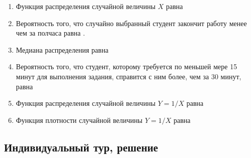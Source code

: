 \begin{enumerate}
\begin{enumerate}
\item Функция распределения случайной величины $X$ равна \underline{\hspace{2cm}}
\item Вероятность того, что случайно выбранный студент закончит работу менее чем за полчаса равна \underline{\hspace{2cm}}.
\item Медиана распределения равна \underline{\hspace{2cm}}
\item Вероятность того, что студент, которому требуется по меньшей мере 15 минут для выполнения задания, справится с ним более, чем за 30 минут, равна \underline{\hspace{2cm}}
\item Функция распределения случайной величины $Y=1/X$ равна \underline{\hspace{2cm}}
\item Функция плотности случайной величины $Y=1/X$ равна \underline{\hspace{2cm}}
\end{enumerate}

\end{enumerate}

\subsection{Индивидуальный тур, решение}


